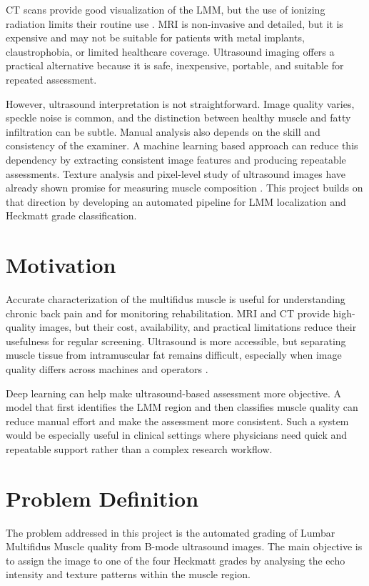 \documentclass[twocolumn,10pt]{article}
\begin{document}
CT scans provide good visualization of the LMM, but the use of ionizing radiation limits their routine use \cite{Brenner2022}. MRI is non-invasive and detailed, but it is expensive and may not be suitable for patients with metal implants, claustrophobia, or limited healthcare coverage. Ultrasound imaging offers a practical alternative because it is safe, inexpensive, portable, and suitable for repeated assessment.

However, ultrasound interpretation is not straightforward. Image quality varies, speckle noise is common, and the distinction between healthy muscle and fatty infiltration can be subtle. Manual analysis also depends on the skill and consistency of the examiner. A machine learning based approach can reduce this dependency by extracting consistent image features and producing repeatable assessments. Texture analysis and pixel-level study of ultrasound images have already shown promise for measuring muscle composition \cite{Pincheira2024}. This project builds on that direction by developing an automated pipeline for LMM localization and Heckmatt grade classification.

\section{Motivation}
\label{motivation}
Accurate characterization of the multifidus muscle is useful for understanding chronic back pain and for monitoring rehabilitation. MRI and CT provide high-quality images, but their cost, availability, and practical limitations reduce their usefulness for regular screening. Ultrasound is more accessible, but separating muscle tissue from intramuscular fat remains difficult, especially when image quality differs across machines and operators \cite{Sions2017}.

Deep learning can help make ultrasound-based assessment more objective. A model that first identifies the LMM region and then classifies muscle quality can reduce manual effort and make the assessment more consistent. Such a system would be especially useful in clinical settings where physicians need quick and repeatable support rather than a complex research workflow.

\section{Problem Definition}
\label{problem}
The problem addressed in this project is the automated grading of Lumbar Multifidus Muscle quality from B-mode ultrasound images. The main objective is to assign the image to one of the four Heckmatt grades by analysing the echo intensity and texture patterns within the muscle region.
\end{document}

